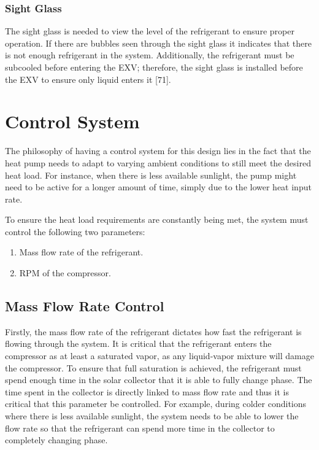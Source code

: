 \subsubsection{Sight Glass}

The sight glass is needed to view the level of the refrigerant to ensure proper operation. If there are bubbles seen through the sight glass it indicates that there is not enough refrigerant in the system. Additionally, the refrigerant must be subcooled before entering the EXV; therefore, the sight glass is installed before the EXV to ensure only liquid enters it [71].

\section{Control System}

The philosophy of having a control system for this design lies in the fact that the heat pump needs to adapt to varying ambient conditions to still meet the desired heat load. For instance, when there is less available sunlight, the pump might need to be active for a longer amount of time, simply due to the lower heat input rate.

\medskip
To ensure the heat load requirements are constantly being met, the system must control the following two parameters:

\medskip
\begin{enumerate}[itemsep=3mm, parsep=-1mm, label=\roman*.]
	\item Mass flow rate of the refrigerant.
	\item RPM of the compressor.
\end{enumerate}

\subsection{Mass Flow Rate Control}

Firstly, the mass flow rate of the refrigerant dictates how fast the refrigerant is flowing through the system. It is critical that the refrigerant enters the compressor as at least a saturated vapor, as any liquid-vapor mixture will damage the compressor. To ensure that full saturation is achieved, the refrigerant must spend enough time in the solar collector that it is able to fully change phase. The time spent in the collector is directly linked to mass flow rate and thus it is critical that this parameter be controlled. For example, during colder conditions where there is less available sunlight, the system needs to be able to lower the flow rate so that the refrigerant can spend more time in the collector to completely changing phase.

